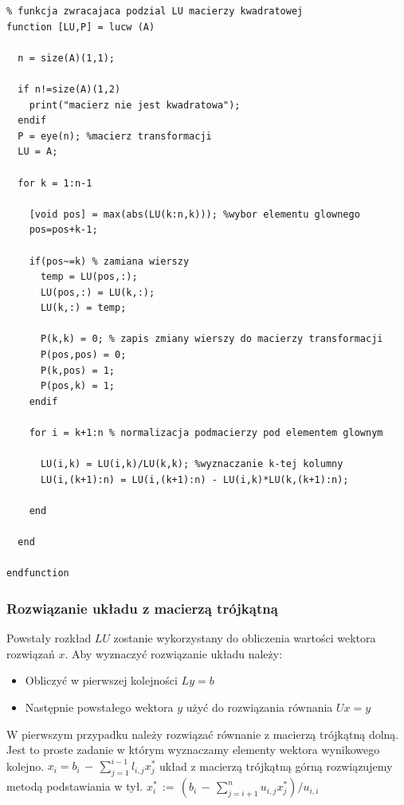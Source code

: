 \documentclass[a4paper, 11pt]{article}
\begin{document}
\begin{lstlisting}
% funkcja zwracajaca podzial LU macierzy kwadratowej
function [LU,P] = lucw (A)

  n = size(A)(1,1);
  
  if n!=size(A)(1,2) 
    print("macierz nie jest kwadratowa");
  endif
  P = eye(n); %macierz transformacji
  LU = A; 
  
  for k = 1:n-1
      
    [void pos] = max(abs(LU(k:n,k))); %wybor elementu glownego
    pos=pos+k-1;
  
    if(pos~=k) % zamiana wierszy
      temp = LU(pos,:);
      LU(pos,:) = LU(k,:);
      LU(k,:) = temp;
        
      P(k,k) = 0; % zapis zmiany wierszy do macierzy transformacji
      P(pos,pos) = 0;
      P(k,pos) = 1;
      P(pos,k) = 1;
    endif
             
    for i = k+1:n % normalizacja podmacierzy pod elementem glownym
          
      LU(i,k) = LU(i,k)/LU(k,k); %wyznaczanie k-tej kolumny
      LU(i,(k+1):n) = LU(i,(k+1):n) - LU(i,k)*LU(k,(k+1):n);
      
    end
    
  end
  
endfunction

\end{lstlisting}

\subsubsection{Rozwiązanie układu z macierzą trójkątną}

Powstały rozkład $LU$ zostanie wykorzystany do obliczenia wartości wektora rozwiązań $x$. 
Aby wyznaczyć rozwiązanie układu należy:
\begin{itemize}
\item Obliczyć w pierwszej kolejności $Ly = b$ 
\item Następnie powstałego wektora $y$ użyć do rozwiązania równania $Ux = y$
\end{itemize}
W pierwszym przypadku należy rozwiązać równanie z macierzą trójkątną dolną. Jest to proste zadanie w którym wyznaczamy elementy wektora wynikowego kolejno. $x_i = b_i\,-\,\sum_{j=1}^{i-1} l_{i,j} x_j^*$
układ z macierzą trójkątną górną rozwiązujemy metodą podstawiania w tył. $x_i^*\,:=\,\left( b_i\,-\, \sum_{j=i+1}^n u_{i,j}x_j^*\right)/u_{i,i}$\\
\end{document}
